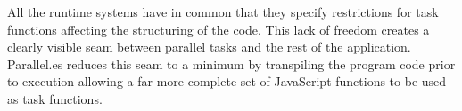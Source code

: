 All the runtime systems have in common that they specify restrictions for task functions affecting the structuring of the code. This lack of freedom creates a clearly visible seam between parallel tasks and the rest of the application. Parallel.es reduces this seam to a minimum by transpiling the program code prior to execution allowing a far more complete set of JavaScript functions to be used as task functions.
